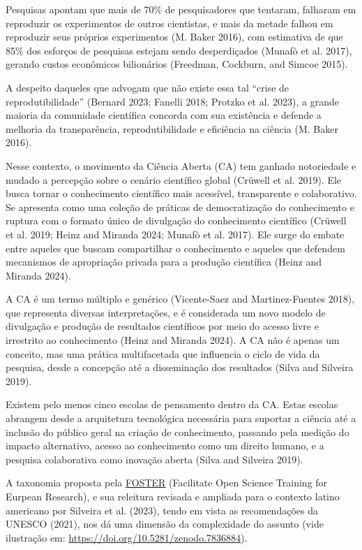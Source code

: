 \documentclass[
  a4paper,
]{article}
\begin{document}
Pesquisas apontam que mais de 70\% de pesquisadores que tentaram,
falharam em reproduzir os experimentos de outros cientistas, e mais da
metade falhou em reproduzir seus próprios experimentos (M. Baker 2016),
com estimativa de que 85\% dos esforços de pesquisas estejam sendo
desperdiçados (Munafò et al. 2017), gerando custos econômicos
bilionários (Freedman, Cockburn, and Simcoe 2015).

A despeito daqueles que advogam que não existe essa tal ``crise de
reprodutibilidade'' (Bernard 2023; Fanelli 2018; Protzko et al. 2023), a
grande maioria da comunidade científica concorda com sua existência e
defende a melhoria da transparência, reprodutibilidade e eficiência na
ciência (M. Baker 2016).

Nesse contexto, o movimento da Ciência Aberta (CA) tem ganhado
notoriedade e mudado a percepção sobre o cenário científico global
(Crüwell et al. 2019). Ele busca tornar o conhecimento científico mais
acessível, transparente e colaborativo. Se apresenta como uma coleção de
práticas de democratização do conhecimento e ruptura com o formato único
de divulgação do conhecimento científico (Crüwell et al. 2019; Heinz and
Miranda 2024; Munafò et al. 2017). Ele surge do embate entre aqueles que
buscam compartilhar o conhecimento e aqueles que defendem mecanismos de
apropriação privada para a produção científica (Heinz and Miranda 2024).

A CA é um termo múltiplo e genérico (Vicente-Saez and Martinez-Fuentes
2018), que representa diversas interpretações, e é considerada um novo
modelo de divulgação e produção de resultados científicos por meio do
acesso livre e irrestrito ao conhecimento (Heinz and Miranda 2024). A CA
não é apenas um conceito, mas uma prática multifacetada que influencia o
ciclo de vida da pesquisa, desde a concepção até a disseminação dos
resultados (Silva and Silveira 2019).

Existem pelo menos cinco escolas de pensamento dentro da CA. Estas
escolas abrangem desde a arquitetura tecnológica necessária para
suportar a ciência até a inclusão do público geral na criação de
conhecimento, passando pela medição do impacto alternativo, acesso ao
conhecimento como um direito humano, e a pesquisa colaborativa como
inovação aberta (Silva and Silveira 2019).

A taxonomia proposta pela
\href{https://www.fosteropenscience.eu/foster-taxonomy/open-workflow-tools}{FOSTER}
(Facilitate Open Science Training for Eurpean Research), e sua releitura
revisada e ampliada para o contexto latino americano por Silveira et al.
(2023), tendo em vista as recomendações da UNESCO (2021), nos dá uma
dimensão da complexidade do assunto (vide ilustração em:
\url{https://doi.org/10.5281/zenodo.7836884}).
\end{document}
